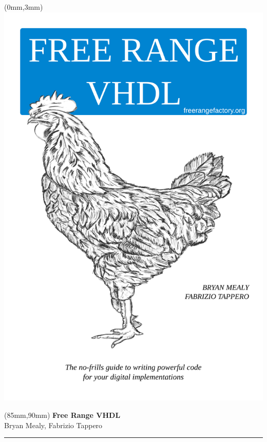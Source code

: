 \documentclass[11pt,b5paper]{book} %
\begin{document}
	\thispagestyle{empty}
	\begin{textblock*}{160mm}(0mm,3mm)
    \includegraphics[width=155mm]{pics/cover.png}  %
	\end{textblock*}
	\null\newpage %

	\thispagestyle{empty}
	\null\newpage

	\thispagestyle{empty}
	\begin{textblock*}{60mm}(85mm,90mm)
	\noindent
	{\sffamily\huge\bfseries Free Range VHDL}\\
	\noindent
	{\sffamily Bryan Mealy, Fabrizio Tappero}\\
	{\color{dark-gray}\rule[5pt]{190pt}{4pt}}
	\end{textblock*}
	\null\newpage
\end{document}
